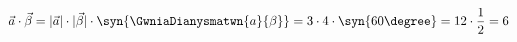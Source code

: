 \[ \vec{a}\cdot\vec{\beta}=|\vec{a}|\cdot|\vec{\beta}|\cdot\syn{\GwniaDianysmatwn{a}{\beta}}=3\cdot 4\cdot\syn{60\degree}=12\cdot\frac{1}{2}=6 \]
